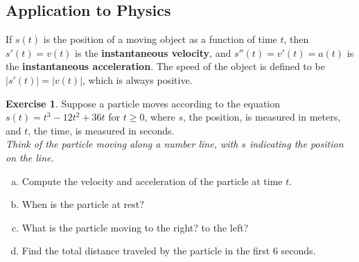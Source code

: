 \documentclass[11pt,reqno,final]{amsart}
\numberwithin{figure}{section}
\theoremstyle{definition} %
\newtheorem{exercise}[question]{Exercise}
\begin{document}
\subsection*{Application to Physics}

If $s(t)$ is the position of a moving object as a function of time $t$, then
$s'(t) = v(t)$ is the \textbf{instantaneous velocity}, and
$s''(t) = v'(t) = a(t)$ is the \textbf{instantaneous acceleration}.
The speed of the object is defined to be $|s'(t)| = |v(t)|$, which is always positive.

\begin{exercise}
        Suppose a particle moves according to the equation $s(t) = t^3 - 12t^2 + 36t$ for $t \geq 0$,
        where $s$, the position, is measured in meters, and $t$, the time, is measured in seconds.\\
        \textit{Think of the particle moving along a number line, with $s$ indicating the position on the line.}
        \begin{enumerate}[(a)]
        \item Compute the velocity and acceleration of the particle at time $t$.
                \vfill
        \item When is the particle at rest?
                \vfill
        \item What is the particle moving to the right? to the left?
                \vfill
        \item Find the total distance traveled by the particle in the first 6 seconds.
                \vfill
        \end{enumerate}
        
\end{exercise}
\end{document}
